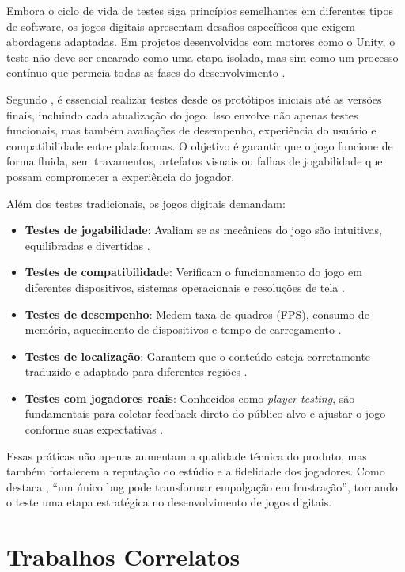 Embora o ciclo de vida de testes siga princípios semelhantes em diferentes tipos de software, os jogos digitais apresentam desafios específicos que exigem abordagens adaptadas. Em projetos desenvolvidos com motores como o Unity, o teste não deve ser encarado como uma etapa isolada, mas sim como um processo contínuo que permeia todas as fases do desenvolvimento .

Segundo , é essencial realizar testes desde os protótipos iniciais até as versões finais, incluindo cada atualização do jogo. Isso envolve não apenas testes funcionais, mas também avaliações de desempenho, experiência do usuário e compatibilidade entre plataformas. O objetivo é garantir que o jogo funcione de forma fluida, sem travamentos, artefatos visuais ou falhas de jogabilidade que possam comprometer a experiência do jogador.

Além dos testes tradicionais, os jogos digitais demandam:

\begin{itemize}
    \item \textbf{Testes de jogabilidade}: Avaliam se as mecânicas do jogo são intuitivas, equilibradas e divertidas .
    \item \textbf{Testes de compatibilidade}: Verificam o funcionamento do jogo em diferentes dispositivos, sistemas operacionais e resoluções de tela .
    \item \textbf{Testes de desempenho}: Medem taxa de quadros (FPS), consumo de memória, aquecimento de dispositivos e tempo de carregamento .
    \item \textbf{Testes de localização}: Garantem que o conteúdo esteja corretamente traduzido e adaptado para diferentes regiões .
    \item \textbf{Testes com jogadores reais}: Conhecidos como \textit{player testing}, são fundamentais para coletar feedback direto do público-alvo e ajustar o jogo conforme suas expectativas .
\end{itemize}

Essas práticas não apenas aumentam a qualidade técnica do produto, mas também fortalecem a reputação do estúdio e a fidelidade dos jogadores. Como destaca , “um único bug pode transformar empolgação em frustração”, tornando o teste uma etapa estratégica no desenvolvimento de jogos digitais.

\section{Trabalhos Correlatos}

